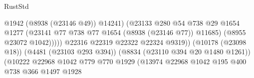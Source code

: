 \begin{lexlean}{RustStd}
\begin{coremodule}
                                                            @1942
                                                            (@8938 (@23146 @49))
                                                            @14241)
                                                          (@23133
                                                            @280
                                                            @54
                                                            @738
                                                            @29
                                                            @1654
                                                            @1277
                                                            (@23141
                                                              @77
                                                              @738
                                                              @77
                                                              @1654
                                                              (@8938 (@23146 @77))
                                                              @11685)
                                                            (@8955 @23072 @1042)))))
                                                    @22316
                                                    @22319
                                                    @22322
                                                    @22324
                                                    @9319))
                                                (@10178 (@23098 @18))
                                                (@4481 (@23103 @293 @394))
                                                (@8834 (@23110 @394 @20 @1480 @1261))
                                                (@10222
                                                  @22968
                                                  @1042
                                                  @779
                                                  @770
                                                  @1929
                                                  (@13974
                                                    @22968
                                                    @1042
                                                    @195
                                                    @400
                                                    @738
                                                    @366
                                                    @1497
                                                    @1928

\end{coremodule}
\end{lexlean}
